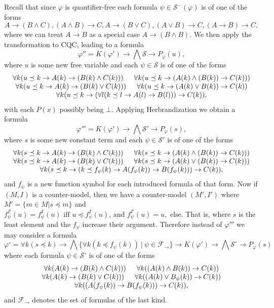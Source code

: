 \documentclass[a4paper,UKenglish,cleveref, autoref, thm-restate]{lipics-v2021}
\begin{document}
Recall that since $\varphi$ is quantifier-free each formula $\psi\in\mathcal S^-(\varphi)$ is of one of the forms
$$A\to (B\wedge C), (A\wedge B)\to C, A\to (B\vee C), (A\vee B)\to C, (A\to B)\to C,$$
where we can treat $A\to B$ as a special case $A\to (B\wedge B)$. We then apply the transformation to CQC, leading to a formula
$$\varphi'' = K(\varphi')\to\bigwedge  \mathcal S\to P_\varphi(u),$$
where $u$ is some new free variable and each $\psi\in\mathcal S$ is of one of the forms
$$\begin{matrix}
	\forall k(u\preceq k\to A(k)\to (B(k)\wedge C(k)))\indent  \forall k(u\preceq k\to (A(k)\wedge (B(k))\to C(k)))\\
	\forall k(u\preceq k\to A(k)\to (B(k)\vee C(k)))\indent \forall k(u\preceq k\to (A(k)\vee B(k))\to C(k))\\
	\forall k(u\preceq k\to (\forall l(k\preceq l \to A(l)\to B(l)))\to C(k)),
\end{matrix}$$
with each $P(x)$ possibly being $\bot$. Applying Herbrandization we obtain a formula
$$\varphi''' = K(\varphi')\to \bigwedge \mathcal S'\to P_\varphi(s),$$
where $s$ is some new constant term and each $\psi\in\mathcal S'$ is of one of the forms
$$\begin{matrix}
	\forall k(s\preceq k\to A(k)\to (B(k)\wedge C(k)))\indent \forall k(s\preceq k\to (A(k)\wedge (B(k))\to C(k)))\\
	\forall k(s\preceq k\to A(k)\to (B(k)\vee C(k)))\indent \forall k(s\preceq k\to (A(k)\vee (B(k))\to C(k)))\\
	\forall k(s\preceq k\to (k\preceq f_\psi(k) \to A(f_\psi(k))\to B(f_\psi(k)))\to C(k)),\\
\end{matrix}$$
and $f_\psi$ is a new function symbol for each introduced formula of that form. Now if $(M, I)$ is a counter-model, then we have a counter-model $(M',I')$ where $M' = \{m\in M|s\preceq m\}$ and
$f_\psi^{I'}(u) = f^I_\psi(u) \text{ iff $u\preceq f^{I}_\psi(u)$, and $f_\psi^{I'}(u) = u,$ else.}$ That is, where $s$ is the least element and the $f_\psi$ increase their argument. Therefore instead of $\varphi'''$ we may consider a formula $$\varphi^\circ = \forall k(s\preceq k)\to \bigwedge\{\forall k(k\preceq f_\psi(k))\:|\:\psi\in\mathcal F_\to\}\to K(\varphi')\to \bigwedge \mathcal S^\circ\to P_\varphi(s)$$ where each formula $\psi\in\mathcal S^\circ$ is of one of the forms
$$\begin{matrix}
	\forall k(A(k)\to (B(k)\wedge C(k)))\indent\forall k((A(k)\wedge B(k))\to C(k))\\
	\forall k(A(k)\to (B(k)\vee C(k)))\indent\forall k((A(k)\vee B_\psi(k))\to C(k))\\
	\forall k((A(f_\psi(k))\to B(f_\psi(k)))\to C(k)),
\end{matrix}$$
and $\mathcal F_\to$ denotes the set of formulas of the last kind.
\end{document}
